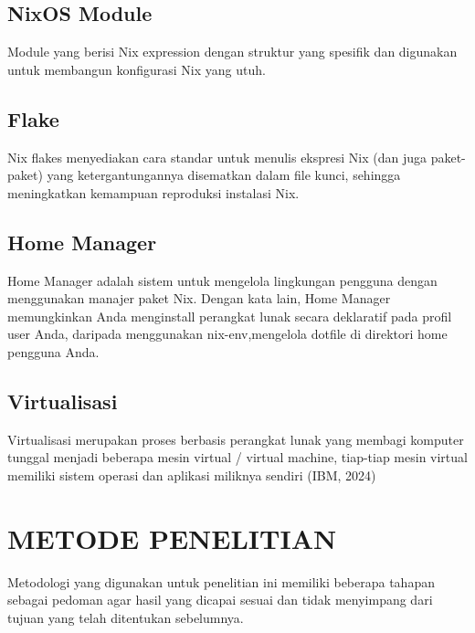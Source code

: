 \documentclass[10pt,]{report}
\begin{document}
\section{NixOS Module}
\begin{adjustwidth}{20pt}{}
	\vspace{-3mm}
	Module yang berisi Nix expression dengan struktur yang spesifik dan digunakan
	untuk membangun konfigurasi Nix yang utuh.
\end{adjustwidth}
\section{Flake}
\begin{adjustwidth}{20pt}{}
	\vspace{-3mm} Nix flakes menyediakan cara standar untuk menulis ekspresi Nix (dan juga paket-paket) yang ketergantungannya disematkan dalam file kunci, sehingga meningkatkan kemampuan reproduksi instalasi Nix.
\end{adjustwidth}
\section{Home Manager}
\begin{adjustwidth}{20pt}{}
	\vspace{-3mm}
	Home Manager adalah sistem untuk mengelola lingkungan pengguna dengan
	menggunakan manajer paket Nix. Dengan kata lain, Home Manager memungkinkan
	Anda menginstall perangkat lunak secara deklaratif pada profil user Anda,
	daripada menggunakan nix-env,mengelola dotfile di direktori home pengguna
	Anda.
\end{adjustwidth}
\section{Virtualisasi}
\begin{adjustwidth}{20pt}{}
	\vspace{-3mm}
	Virtualisasi merupakan proses berbasis perangkat lunak yang membagi komputer
	tunggal menjadi beberapa mesin virtual / virtual machine, tiap-tiap mesin
	virtual memiliki sistem operasi dan aplikasi miliknya sendiri (IBM, 2024)
\end{adjustwidth}


\chapter{METODE PENELITIAN}
Metodologi yang digunakan untuk penelitian ini memiliki beberapa tahapan
sebagai pedoman agar hasil yang dicapai sesuai dan tidak menyimpang dari tujuan
yang telah ditentukan sebelumnya.\\
\end{document}
